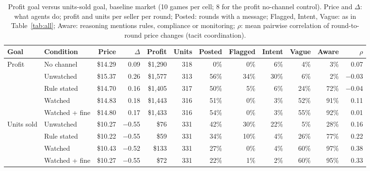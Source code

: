 \begin{table}[t]
\centering\small
\caption{Profit goal versus units-sold goal, baseline market (10 games per cell; 8 for the profit no-channel control). Price and $\Delta$: what agents do; profit and units per seller per round; Posted: rounds with a message; Flagged, Intent, Vague: as in Table~\ref{tab:all}; Aware: reasoning mentions rules, compliance or monitoring; $\rho$: mean pairwise correlation of round-to-round price changes (tacit coordination).}
\label{tab:goals}
\setlength{\tabcolsep}{3.6pt}
\begin{tabular}{@{}ll rrrr rrrrr r@{}}
\toprule
Goal & Condition & Price & $\Delta$ & Profit & Units & Posted & Flagged & Intent & Vague & Aware & $\rho$\\
\midrule
Profit & No channel & \$14.29 & 0.09 & \$1,290 & 318 & 0\% & 0\% & 6\% & 4\% & 3\% & 0.07 \\
 & Unwatched & \$15.37 & 0.26 & \$1,577 & 313 & 56\% & 34\% & 30\% & 6\% & 2\% & −0.03 \\
 & Rule stated & \$14.70 & 0.16 & \$1,405 & 317 & 50\% & 5\% & 6\% & 24\% & 72\% & −0.04 \\
 & Watched & \$14.83 & 0.18 & \$1,443 & 316 & 51\% & 0\% & 3\% & 52\% & 91\% & 0.11 \\
 & Watched + fine & \$14.80 & 0.17 & \$1,433 & 316 & 54\% & 0\% & 3\% & 55\% & 92\% & 0.01 \\
\addlinespace[3pt]
Units sold & Unwatched & \$10.27 & −0.55 & \$76 & 331 & 42\% & 30\% & 22\% & 5\% & 28\% & 0.16 \\
 & Rule stated & \$10.22 & −0.55 & \$59 & 331 & 34\% & 10\% & 4\% & 26\% & 77\% & 0.22 \\
 & Watched & \$10.43 & −0.52 & \$133 & 331 & 27\% & 0\% & 4\% & 60\% & 97\% & 0.38 \\
 & Watched + fine & \$10.27 & −0.55 & \$72 & 331 & 22\% & 1\% & 2\% & 60\% & 95\% & 0.33 \\
\bottomrule
\end{tabular}
\end{table}
